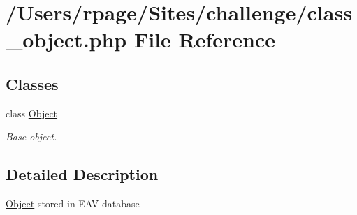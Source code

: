 \hypertarget{class__object_8php}{
\section{/Users/rpage/Sites/challenge/class\_\-object.php File Reference}
\label{class__object_8php}
}
\subsection*{Classes}
\begin{CompactItemize}
\item 
class \hyperlink{class_object}{Object}
\begin{CompactList}\small\item\em Base object. \item\end{CompactList}\end{CompactItemize}


\subsection{Detailed Description}
\hyperlink{class_object}{Object} stored in EAV database 